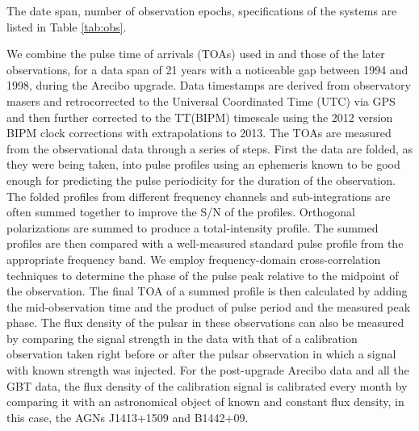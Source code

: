 {The date span, number of observation epochs, specifications of the
systems are listed in Table \ref{tab:obs}. 
}

We combine the pulse time of arrivals (TOAs) used in \citealt{sns+05} and those
of the later observations, for a data span of 21 years with a
noticeable gap between 1994 and 1998, during the Arecibo upgrade.
Data timestamps are derived from observatory masers and retrocorrected
to the Universal Coordinated Time (UTC) via GPS and then further
corrected to the TT(BIPM) timescale using the 2012 version BIPM clock corrections with extrapolations to 2013.
The TOAs are measured from the observational data through a series of
steps. First the data are folded, as they were being taken, into pulse
profiles using an ephemeris known to be good enough for predicting the
pulse periodicity for the duration of the observation. The folded
profiles from different frequency channels and sub-integrations are
often summed together to improve the S/N of the profiles.  Orthogonal
polarizations are summed to produce a total-intensity profile.
The summed profiles are then compared with a well-measured standard
pulse profile from the appropriate frequency band. We employ
frequency-domain cross-correlation techniques \citep{tay92} to determine the phase of the pulse peak relative to the midpoint of the observation. The final TOA of a summed profile is then calculated by adding the mid-observation time and the product of pulse period and the measured peak phase.
The flux density of the pulsar in these observations can also be
measured by comparing the signal strength in the data with that of a
calibration observation taken right before or after the pulsar
observation in which a signal with known strength was injected. For
the post-upgrade Arecibo data and all the GBT data, the
flux density of the calibration signal is calibrated every month by
comparing it with an astronomical object of known and constant flux
density, in this case, the AGNs J1413+1509 and B1442+09.


